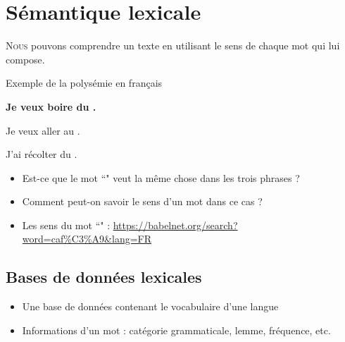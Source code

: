 \documentclass{KodeBook}
\begin{document}
		\mainmatter
	
\fi
\chapter{Sémantique lexicale}

\begin{introduction}
	\lettrine{N}{ous} pouvons comprendre un texte en utilisant le sens de chaque mot qui lui compose. 
\end{introduction} 

\begin{exampleblock}{Exemple de la polysémie en français}
	\begin{center}
		\Large\bfseries
		Je veux boire du .
		
		Je veux aller au .
		
		J'ai récolter du .
	\end{center}
\end{exampleblock}

\begin{itemize}
	\item Est-ce que le mot ``" veut la même chose dans les trois phrases ?
	\item Comment peut-on savoir le sens d'un mot dans ce cas ?
	\item Les sens du mot ``" : \url{https://babelnet.org/search?word=caf\%C3\%A9&lang=FR}
\end{itemize}

\section{Bases de données lexicales}

\begin{itemize}
	\item Une base de données contenant le vocabulaire d'une langue
	\item Informations d'un mot : catégorie grammaticale, lemme, fréquence, etc.
\end{itemize}
\end{document}
